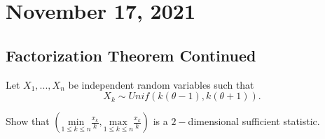 \section{November 17, 2021}
\subsection{Factorization Theorem Continued}
\begin{example}
    Let $X_1,...,X_n$ be independent random variables such that $$X_k \sim Unif(k(\theta -1), k(\theta+1)).$$
    
    Show that $ \left ( \displaystyle \underset{1 \leq k \leq n}{\mathrm{min}} \frac{x_k}{k}, \underset{1 \leq k \leq n}{\mathrm{max}} \frac{x_k}{k}
    \right )$ is a $2-$dimensional sufficient statistic. 
    
\end{example}